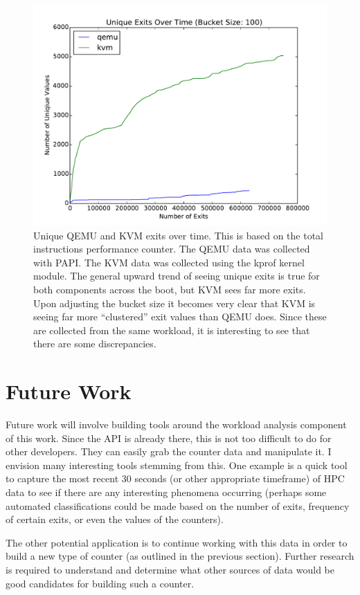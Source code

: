 \documentclass[notitlepage]{article}
\begin{document}
\begin{figure}[htpb!]
\centering
\includegraphics[width=1\textwidth]{qemu_kvm_overtime.pdf}
\caption{Unique QEMU and KVM exits over time. This is based on the total
instructions performance counter. The QEMU data was collected with PAPI. The KVM
data was collected using the kprof kernel module. The general upward trend of
seeing unique exits is true for both components across the boot, but KVM sees
far more exits. Upon adjusting the bucket size it becomes very clear that KVM
is seeing far more ``clustered'' exit values than QEMU does. Since these are
collected from the same workload, it is interesting to see that there are some
discrepancies.}
\label{fig:qemukvm}
\end{figure}


\section{Future Work}
\label{sec:futurework}
Future work will involve building tools around the workload analysis component
of this work. Since the API is already there, this is not too difficult to do
for other developers. They can easily grab the counter data and manipulate it. I
envision many interesting tools stemming from this. One example is a quick tool
to capture the most recent 30 seconds (or other appropriate timeframe) of HPC
data to see if there are any interesting phenomena occurring (perhaps some
automated classifications could be made based on the number of exits, frequency
of certain exits, or even the values of the counters).

The other potential application is to continue working with this data in order
to build a new type of counter (as outlined in the previous section). Further
research is required to understand and determine what other sources of data
would be good candidates for building such a counter.
\end{document}
